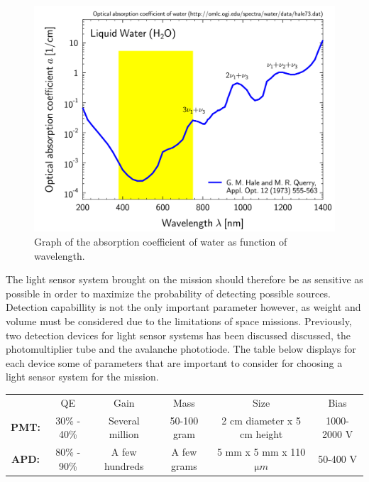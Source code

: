 \begin{figure}[htb]
\begin{center}
\includegraphics[scale=0.8]{figures/RCS/absorption_watef}
\caption{Graph of the absorption coefficient of water as function of wavelength.}
\label{fig:water_abs}
\end{center}
\end{figure}

The light sensor system brought on the mission should therefore be as sensitive as possible in order to maximize the probability of detecting possible sources. Detection capabillity is not the only important parameter however, as weight and volume must be considered due to the limitations of space missions. Previously, two detection devices for light sensor systems has been discussed discussed, the photomultiplier tube and the avalanche phototiode. The table below displays for each device some of parameters that are important to consider for choosing a light sensor system for the mission.\
	
\begin{center}
\begin{tabular}{ |c|c|c|c|c|c| } 
 \hline
               & QE & Gain & Mass & Size & Bias \\
 \textbf{PMT:} & 30\% - 40\% & Several million & 50-100 gram & 2 cm diameter x 5 cm height & 1000-2000 V \\ 
 \textbf{APD:} & 80\% - 90\% & A few hundreds & A few grams  & 5 mm x 5 mm x 110 $\mathrm{\mu}m$ & 50-400 V \\
 \hline
\end{tabular}
\end{center}
	
